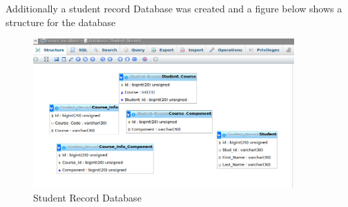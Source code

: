 \documentclass[10pt,onecolumn]{lab}
\begin{document}
Additionally a student record Database was created and a figure below shows a structure for the database

\begin{center}
\begin{figure}[h]
\centering
\includegraphics[width=10cm]{StudentRecord}
\caption{Student Record Database}
\end{figure}
\end{center}
  
\newpage


 
\vfill



\end{document}
